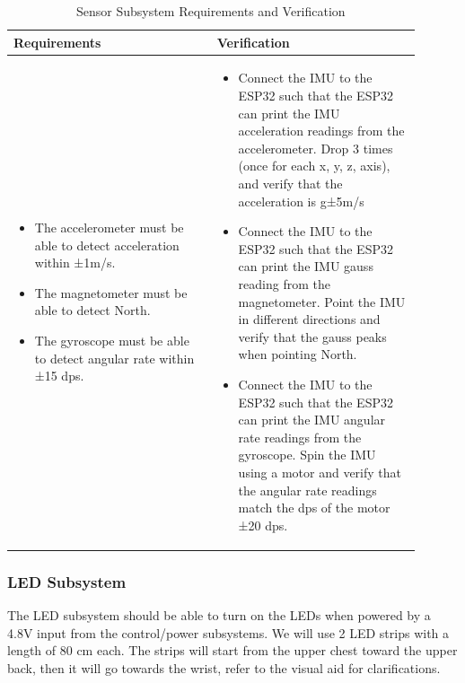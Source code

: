 \documentclass[12pt]{article}
\begin{document}
    \begin{table}[h]
        \centering
        \caption{Sensor Subsystem Requirements and Verification}
        \begin{tabular}{p{0.45\linewidth}p{0.45\linewidth}}
        \toprule
        \textbf{Requirements} & \textbf{Verification} \\
        \midrule
        \begin{itemize}[leftmargin=*, nosep, after=\strut]
            \item The accelerometer must be able to detect acceleration within ±1m/s.
            \item The magnetometer must be able to detect North.
            \item The gyroscope must be able to detect angular rate within ±15 dps.
            
            
        \end{itemize} &
        \begin{itemize}[leftmargin=*, nosep, after=\strut]
            \item Connect the IMU to the ESP32 such that the ESP32 can print the IMU acceleration readings from the accelerometer. Drop 3 times (once for each x, y, z, axis), and verify that the acceleration is g±5m/s
            \item Connect the IMU to the ESP32 such that the ESP32 can print the IMU gauss reading from the magnetometer. Point the IMU in different directions and verify that the gauss peaks when pointing North.
            \item Connect the IMU to the ESP32 such that the ESP32 can print the IMU angular rate readings from the gyroscope. Spin the IMU using a motor and verify that the angular rate readings match the dps of the motor ±20 dps.
            
        \end{itemize} \\
        \bottomrule
        \end{tabular}
        \end{table}
        \newpage
    \subsubsection{LED Subsystem} 
    The LED subsystem should be able to turn on the LEDs when powered by a 4.8V input from the control/power subsystems. We will use 2 LED strips with a length of 80 cm each. The strips will start from the upper chest toward the upper back, then it will go towards the wrist, refer to the visual aid for clarifications. 
\end{document}

